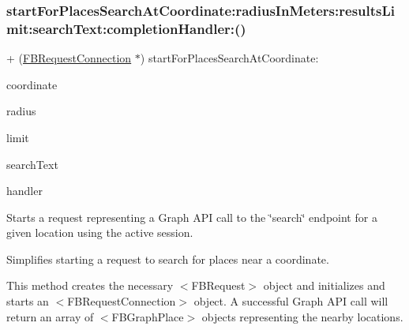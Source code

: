 \subsubsection{\texorpdfstring{start\+For\+Places\+Search\+At\+Coordinate\+:radius\+In\+Meters\+:results\+Limit\+:search\+Text\+:completion\+Handler\+:()}{startForPlacesSearchAtCoordinate:radiusInMeters:resultsLimit:searchText:completionHandler:()}\hspace{0.1cm}{\footnotesize\ttfamily [1/5]}}
{\footnotesize\ttfamily + (\hyperlink{interfaceFBRequestConnection}{F\+B\+Request\+Connection} $\ast$) start\+For\+Places\+Search\+At\+Coordinate\+: \begin{DoxyParamCaption}\item[{(C\+L\+Location\+Coordinate2D)}]{coordinate }\item[{radiusInMeters:(N\+S\+Integer)}]{radius }\item[{resultsLimit:(N\+S\+Integer)}]{limit }\item[{searchText:(N\+S\+String $\ast$)}]{search\+Text }\item[{completionHandler:(F\+B\+Request\+Handler)}]{handler }\end{DoxyParamCaption}}

Starts a request representing a Graph A\+PI call to the \char`\"{}search\char`\"{} endpoint for a given location using the active session.

Simplifies starting a request to search for places near a coordinate.

This method creates the necessary $<$\+F\+B\+Request$>$ object and initializes and starts an $<$\+F\+B\+Request\+Connection$>$ object. A successful Graph A\+PI call will return an array of $<$\+F\+B\+Graph\+Place$>$ objects representing the nearby locations.


